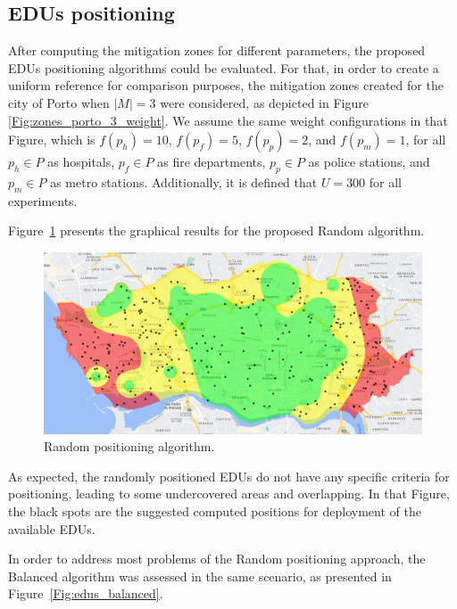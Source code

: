 \begin{refsection}
\subsection{EDUs positioning}

After computing the mitigation zones for different parameters, the proposed EDUs positioning algorithms could be evaluated. For that, in order to create a uniform reference for comparison purposes, the mitigation zones created for the city of Porto when $|M|=3$ were considered, as depicted in Figure \ref{Fig:zones_porto_3_weight}. We assume the same weight configurations in that Figure, which is $f(p_h)=10$, $f(p_f)=5$, $f(p_p)=2$, and $f(p_m)=1$, for all $p_h \in P$ as hospitals, $p_f \in P$ as fire departments, $p_p \in P$ as police stations, and $p_m \in P$ as metro stations. Additionally, it is defined that $U=300$ for all experiments.

Figure~\ref{Fig:edus_random} presents the graphical results for the proposed Random algorithm.

\begin{figure}[htbp!]
    \centering
    \includegraphics[width=0.9\linewidth]{Chapters/2-EDUs/images/porto_M3_random.png}
    \caption{Random positioning algorithm.}
    \label{Fig:edus_random}
\end{figure}

As expected, the randomly positioned EDUs do not have any specific criteria for positioning, leading to some undercovered areas and overlapping. In that Figure, the black spots are the suggested computed positions for deployment of the available EDUs.

In order to address most problems of the Random positioning approach, the Balanced algorithm was assessed in the same scenario, as presented in Figure~\ref{Fig:edus_balanced}.


\end{refsection}
